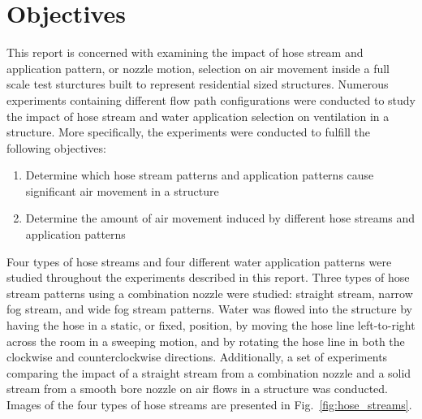 \documentclass[12pt,oneside]{book}
\begin{document}
\section{Objectives}
\label{sec:objectives}
This report is concerned with examining the impact of hose stream and application pattern, or nozzle motion, selection on air movement inside a full scale test sturctures built to represent residential sized structures. Numerous experiments containing different flow path configurations were conducted to study the impact of hose stream and water application selection on ventilation in a structure. More specifically, the experiments were conducted to fulfill the following objectives:
\begin{enumerate}
	\item Determine which hose stream patterns and application patterns cause significant air movement in a structure 
	\item Determine the amount of air movement induced by different hose streams and application patterns
	
\end{enumerate}
Four types of hose streams and four different water application patterns were studied throughout the experiments described in this report. Three types of hose stream patterns using a combination nozzle were studied: straight stream, narrow fog stream, and wide fog stream patterns. Water was flowed into the structure by having the hose in a static, or fixed, position, by moving the hose line left-to-right across the room in a sweeping motion, and by rotating the hose line in both the clockwise and counterclockwise directions. Additionally, a set of experiments comparing the impact of a straight stream from a combination nozzle and a solid stream from a smooth bore nozzle on air flows in a structure was conducted. Images of the four types of hose streams are presented in Fig.~\ref{fig:hose_streams}.
\end{document}
